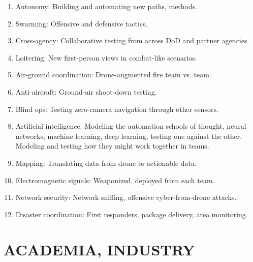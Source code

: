 \documentclass[10pt, letterpaper]{article}
\begin{document}

\begin{enumerate}

\item Autonomy: Building and automating new paths, methods.

\item Swarming: Offensive and defensive tactics.

\item Cross-agency: Collaborative testing from across DoD and partner agencies.

\item Loitering: New first-person views in combat-like scenarios.

\item Air-ground coordination: Drone-augmented fire team vs. team. 

\item Anti-aircraft: Ground-air shoot-down testing.

\item Blind ops: Testing zero-camera navigation through other sensors.

\item Artificial intelligence: Modeling the automation schools of thought, neural networks, machine learning, deep learning, testing one against the other.  Modeling and testing how they might work together in teams. 

\item Mapping: Translating data from drone to actionable data. 

\item Electromagnetic signals: Weaponized, deployed from each team.

\item Network security: Network sniffing, offensive cyber-from-drone attacks. 

\item Disaster coordination: First responders, package delivery, area monitoring.

\end{enumerate}

\section{ACADEMIA, INDUSTRY}
\end{document}
